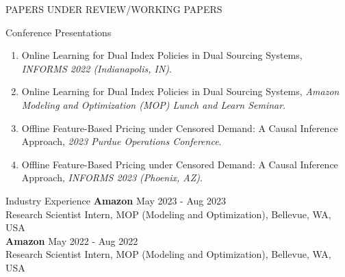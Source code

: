 \documentclass{resume}
\begin{document}
\begin{rSection}{PAPERS UNDER REVIEW/WORKING PAPERS}
\begin{enumerate}
  
  
\end{enumerate}
\end{rSection}

\begin{rSection}{Conference Presentations}
\begin{enumerate}
  \item Online Learning for Dual Index Policies in Dual Sourcing Systems, \textit{INFORMS 2022 (Indianapolis, IN)}.
  \item Online Learning for Dual Index Policies in Dual Sourcing Systems, \textit{Amazon Modeling and Optimization (MOP) Lunch and Learn Seminar}.
  \item Offline Feature-Based Pricing under Censored Demand: A Causal Inference Approach, \textit{2023 Purdue Operations Conference}. 
  \item Offline Feature-Based Pricing under Censored Demand: A Causal Inference Approach, \textit{INFORMS 2023 (Phoenix, AZ)}. 
\end{enumerate}
\end{rSection}

\begin{rSection}{Industry Experience}
 {\bf Amazon} \hfill {May 2023 - Aug 2023}\\
 {Research Scientist Intern, MOP (Modeling and Optimization), Bellevue, WA, USA}\\
 {\bf Amazon} \hfill {May 2022 - Aug 2022}\\
 {Research Scientist Intern, MOP (Modeling and Optimization), Bellevue, WA, USA}
\end{rSection}
\end{document}
